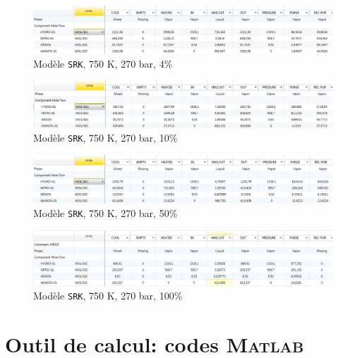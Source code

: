 \documentclass[a4paper, oneside, 12pt]{article}
\begin{document}
\begin{figure}[h!]
	\begin{center}
		\includegraphics[scale=0.5]{SRK,750,270,4.png}
	\end{center}
	\caption{Modèle \texttt{SRK}, 750 K, 270 bar, 4\%}
	\label{fig:SRK,750,270,0.04}
\end{figure}

\begin{figure}[h!]
	\begin{center}
		\includegraphics[scale=0.5]{SRK,750,270,10.png}
	\end{center}
	\caption{Modèle \texttt{SRK}, 750 K, 270 bar, 10\%}
	\label{fig:SRK,750,270,0.1}
\end{figure}

\begin{figure}[h!]
	\begin{center}
		\includegraphics[scale=0.5]{SRK,750,270,50.png}
	\end{center}
	\caption{Modèle \texttt{SRK}, 750 K, 270 bar, 50\%}
	\label{fig:SRK,750,270,0.5}
\end{figure}

\begin{figure}[h!]
	\begin{center}
		\includegraphics[scale=0.5]{SRK,750,270,100.png}
	\end{center}
	\caption{Modèle \texttt{SRK}, 750 K, 270 bar, 100\%}
	\label{fig:SRK,750,270,1}
\end{figure}

\section{Outil de calcul: codes \textsc{Matlab}}
\end{document}
